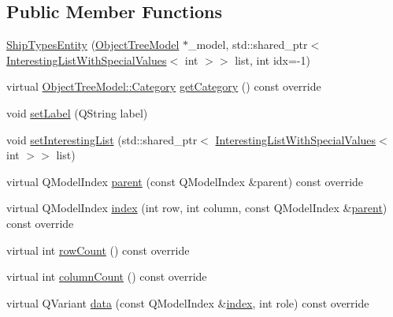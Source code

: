 \subsection*{Public Member Functions}
\begin{DoxyCompactItemize}
\item 
\mbox{\hyperlink{classobjecttree_1_1_ship_types_entity_ac3ba187ce9db2639ad2cbcb9f6182530}{Ship\+Types\+Entity}} (\mbox{\hyperlink{class_object_tree_model}{Object\+Tree\+Model}} $\ast$\+\_\+model, std\+::shared\+\_\+ptr$<$ \mbox{\hyperlink{class_interesting_list_with_special_values}{Interesting\+List\+With\+Special\+Values}}$<$ int $>$$>$ list, int idx=-\/1)
\item 
virtual \mbox{\hyperlink{class_object_tree_model_a379e9d6b0d381853785adf62095ba4e3}{Object\+Tree\+Model\+::\+Category}} \mbox{\hyperlink{classobjecttree_1_1_ship_types_entity_a997458be788afdf00900aaca849825aa}{get\+Category}} () const override
\item 
void \mbox{\hyperlink{classobjecttree_1_1_ship_types_entity_ac40817aba400c67e0f6c6790fde9644d}{set\+Label}} (Q\+String label)
\item 
void \mbox{\hyperlink{classobjecttree_1_1_ship_types_entity_ad1a0331670b6e8f3a316bd04079158a0}{set\+Interesting\+List}} (std\+::shared\+\_\+ptr$<$ \mbox{\hyperlink{class_interesting_list_with_special_values}{Interesting\+List\+With\+Special\+Values}}$<$ int $>$$>$ list)
\item 
virtual Q\+Model\+Index \mbox{\hyperlink{classobjecttree_1_1_ship_types_entity_ac5bf78e5a3d23e5db7b6ea0046f55ccb}{parent}} (const Q\+Model\+Index \&parent) const override
\item 
virtual Q\+Model\+Index \mbox{\hyperlink{classobjecttree_1_1_ship_types_entity_a0ce8b95e0324fe6d91de55e71b4de5fa}{index}} (int row, int column, const Q\+Model\+Index \&\mbox{\hyperlink{classobjecttree_1_1_ship_types_entity_ac5bf78e5a3d23e5db7b6ea0046f55ccb}{parent}}) const override
\item 
virtual int \mbox{\hyperlink{classobjecttree_1_1_ship_types_entity_a498967e616101bb3fc914b02f2c5686b}{row\+Count}} () const override
\item 
virtual int \mbox{\hyperlink{classobjecttree_1_1_ship_types_entity_a037bc899d5bf48e3bcdc13bc009b5238}{column\+Count}} () const override
\item 
virtual Q\+Variant \mbox{\hyperlink{classobjecttree_1_1_ship_types_entity_a6f517c09c22c154d97a9f2c8b5c79c96}{data}} (const Q\+Model\+Index \&\mbox{\hyperlink{classobjecttree_1_1_ship_types_entity_a0ce8b95e0324fe6d91de55e71b4de5fa}{index}}, int role) const override

\end{DoxyCompactItemize}
